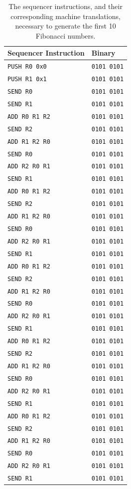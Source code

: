 \documentclass[]{article}
\begin{document}
\begin{table}[H]
\centering
\begin{tabular}{ l | l }
\textbf{Sequencer Instruction} & \textbf{Binary}\\\hline
\texttt{PUSH R0 0x0} & \texttt{0101 0101}\\
\texttt{PUSH R1 0x1} & \texttt{0101 0101}\\
\texttt{SEND R0} & \texttt{0101 0101}\\
\texttt{SEND R1} & \texttt{0101 0101}\\
\texttt{ADD R0 R1 R2} & \texttt{0101 0101}\\
\texttt{SEND R2} & \texttt{0101 0101}\\
\texttt{ADD R1 R2 R0} & \texttt{0101 0101}\\
\texttt{SEND R0} & \texttt{0101 0101}\\
\texttt{ADD R2 R0 R1} & \texttt{0101 0101}\\
\texttt{SEND R1} & \texttt{0101 0101}\\
\texttt{ADD R0 R1 R2} & \texttt{0101 0101}\\
\texttt{SEND R2} & \texttt{0101 0101}\\
\texttt{ADD R1 R2 R0} & \texttt{0101 0101}\\
\texttt{SEND R0} & \texttt{0101 0101}\\
\texttt{ADD R2 R0 R1} & \texttt{0101 0101}\\
\texttt{SEND R1} & \texttt{0101 0101}\\
\texttt{ADD R0 R1 R2} & \texttt{0101 0101}\\
\texttt{SEND R2} & \texttt{0101 0101}\\
\texttt{ADD R1 R2 R0} & \texttt{0101 0101}\\
\texttt{SEND R0} & \texttt{0101 0101}\\
\texttt{ADD R2 R0 R1} & \texttt{0101 0101}\\
\texttt{SEND R1} & \texttt{0101 0101}\\
\texttt{ADD R0 R1 R2} & \texttt{0101 0101}\\
\texttt{SEND R2} & \texttt{0101 0101}\\
\texttt{ADD R1 R2 R0} & \texttt{0101 0101}\\
\texttt{SEND R0} & \texttt{0101 0101}\\
\texttt{ADD R2 R0 R1} & \texttt{0101 0101}\\
\texttt{SEND R1} & \texttt{0101 0101}\\
\texttt{ADD R0 R1 R2} & \texttt{0101 0101}\\
\texttt{SEND R2} & \texttt{0101 0101}\\
\texttt{ADD R1 R2 R0} & \texttt{0101 0101}\\
\texttt{SEND R0} & \texttt{0101 0101}\\
\texttt{ADD R2 R0 R1} & \texttt{0101 0101}\\
\texttt{SEND R1} & \texttt{0101 0101}\\
\end{tabular}
\caption{The sequencer instructions, and their corresponding machine translations, necessary to generate the first 10 Fibonacci numbers.}
\label{table:fib}
\end{table}
\end{document}
